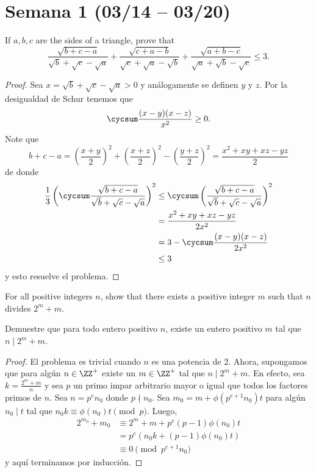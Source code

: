 \section{Semana 1 (03/14 -- 03/20)}

\begin{probEG}
	If $a,b,c$ are the sides of a triangle, prove that
	\[\frac{\sqrt{b+c-a}}{\sqrt b+\sqrt c-\sqrt a}+\frac{\sqrt{c+a-b}}{\sqrt c+\sqrt a-\sqrt b}+\frac{\sqrt{a+b-c}}{\sqrt a+\sqrt b-\sqrt c}\le 3.\]
\end{probEG}

\begin{proof}
	Sea $x=\sqrt b+\sqrt c-\sqrt a>0$ y análogamente se definen $y$ y $z$. Por la desigualdad de Schur tenemos que
	\[\cycsum\frac{(x-y)(x-z)}{x^2}\ge 0.\]
	Note que
	\[b+c-a=\left(\frac{x+y}{2}\right)^2+\left(\frac{x+z}{2}\right)^2-\left(\frac{y+z}{2}\right)^2=\frac{x^2+xy+xz-yz}{2}\]
	de donde
	\begin{align*}
		\frac13\left(\cycsum\frac{\sqrt{b+c-a}}{\sqrt b+\sqrt c-\sqrt a}\right)^2
		&\le\cycsum\left(\frac{\sqrt{b+c-a}}{\sqrt b+\sqrt c-\sqrt a}\right)^2\\
		&=\frac{x^2+xy+xz-yz}{2x^2}\\
		&=3-\cycsum\frac{(x-y)(x-z)}{2x^2}\\
		&\le 3
	\end{align*}
	y esto resuelve el problema.
\end{proof}

\begin{probEB}
	For all positive integers $n$, show that there exists a positive integer $m$ such that $n$ divides $2^m+m$.
	\begin{probSM}
		Demuestre que para todo entero positivo $n$, existe un entero positivo $m$ tal que $n\mid 2^m+m$.
	\end{probSM}
\end{probEB}

\begin{proof}
	El problema es trivial cuando $n$ es una potencia de $2$. Ahora, supongamos que para algún $n\in\ZZ^+$ existe un $m\in\ZZ^+$ tal que $n\mid 2^m+m$. En efecto, sea $k=\frac{2^m+m}{n}$ y sea $p$ un primo impar arbitrario mayor o igual que todos los factores primos de $n$. Sea $n=p^en_0$ donde $p\nmid n_0$. Sea $m_0=m+\phi(p^{e+1}n_0)t$ para algún $n_0\mid t$ tal que $n_0k\equiv\phi(n_0)t\pmod p$. Luego,
	\begin{align*}
		2^{m_0}+m_0
		&\equiv 2^m+m+p^e(p-1)\phi(n_0)t\\
		&=p^e\left(n_0k+(p-1)\phi(n_0)t\right)\\
		&\equiv 0\pmod{p^{e+1}n_0}
	\end{align*}
	y aquí terminamos por inducción.
\end{proof}

